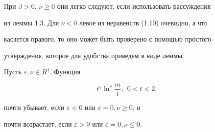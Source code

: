 При $\beta>0$, $\nu \ge 0$ они легко следуют, если использовать рассуждения


из леммы 1.3. Для $\nu <0$ левое из неравенств (1.10) очевидно, а что


касается правого, то оно может быть проверено с помощью простого


утверждения, которое для удобства приведем в виде леммы.





\begin{lems}


Пусть $\varepsilon, \nu \in R^1$. Функция


\begin{equation}


t^\varepsilon \ln^\nu \frac{m}{t},\ \ 0<t<2,


\end{equation}


почти убывает, если $\varepsilon <0$ или $\varepsilon =0, \nu\ge 0$, и


почти возрастает, если $\varepsilon >0$ или $\varepsilon =0, \nu\le 0$.


\end{lems}





